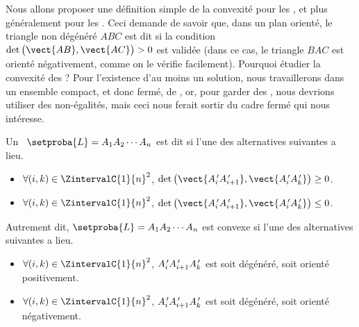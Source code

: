Nous allons proposer une définition simple de la convexité pour les \ngones, et plus généralement pour les \ncycles. Ceci demande de savoir que, dans un plan orienté, le triangle non dégénéré $ABC$ est dit  si la condition $\det \big( \vect{AB} , \vect{AC} \big) > 0$ est validée (dans ce cas, le triangle $BAC$ est orienté négativement, comme on le vérifie facilement).
Pourquoi étudier la convexité des \ncycles? Pour l'existence d'au moins un solution, nous travaillerons dans un ensemble compact, et donc fermé, de \ncycles, or, pour garder des \ngones, nous devrions utiliser des non-égalités, mais ceci nous ferait sortir du cadre fermé qui nous intéresse.




\begin{defi} \label{conv-ncycle-def}
	Un \ncycle\ $\setproba{L} = A_1 A_2 \cdots A_n$ est dit  si  l'une des alternatives suivantes a lieu.
	\begin{itemize}
		\item $\forall (i, k) \in \ZintervalC{1}{n}^2$,
		$\det \big( \vect{\primeit{A}_i \primeit{A}_{i+1}}, \vect{\primeit{A}_i \primeit{A}_k} \big) \geq 0$.

		\item $\forall (i, k) \in \ZintervalC{1}{n}^2$,
		$\det \big( \vect{\primeit{A}_i \primeit{A}_{i+1}}, \vect{\primeit{A}_i \primeit{A}_k} \big) \leq 0$.
    \end{itemize}
	
	Autrement dit, $\setproba{L} = A_1 A_2 \cdots A_n$ est convexe si l'une des alternatives suivantes a lieu.
	\begin{itemize}
		\item $\forall (i, k) \in \ZintervalC{1}{n}^2$,
		$A^{\,\prime}_i A^{\,\prime}_{i+1} A^{\,\prime}_k$ est soit dégénéré, soit  orienté positivement.

		\item $\forall (i, k) \in \ZintervalC{1}{n}^2$,
		$A^{\,\prime}_i A^{\,\prime}_{i+1} A^{\,\prime}_k$ est soit dégénéré, soit  orienté négativement.
    \end{itemize}
\end{defi}


